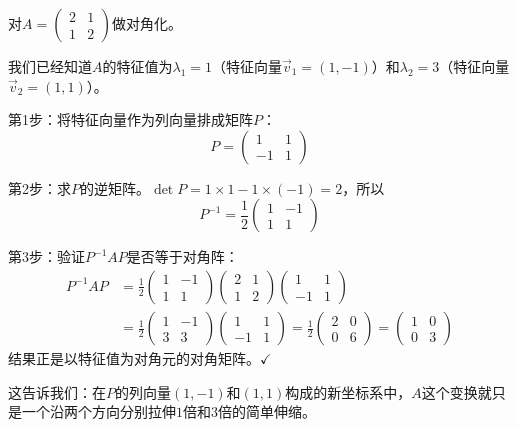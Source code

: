 \begin{example}
对$A=\begin{pmatrix}2&1\\1&2\end{pmatrix}$做对角化。
\end{example}
\begin{solution}
我们已经知道$A$的特征值为$\lambda_1=1$（特征向量$\vec v_1=(1,-1)$）和$\lambda_2=3$（特征向量$\vec v_2=(1,1)$）。

第1步：将特征向量作为列向量排成矩阵$P$：
\[
P = \begin{pmatrix}1&1\\-1&1\end{pmatrix}
\]

第2步：求$P$的逆矩阵。$\det P = 1\times1-1\times(-1)=2$，所以
\[
P^{-1} = \frac12\begin{pmatrix}1&-1\\1&1\end{pmatrix}
\]

第3步：验证$P^{-1}AP$是否等于对角阵：
\begin{align*}
P^{-1}AP &= \frac12\begin{pmatrix}1&-1\\1&1\end{pmatrix}
\begin{pmatrix}2&1\\1&2\end{pmatrix}
\begin{pmatrix}1&1\\-1&1\end{pmatrix}\\[1mm]
&= \frac12\begin{pmatrix}1&-1\\3&3\end{pmatrix}
\begin{pmatrix}1&1\\-1&1\end{pmatrix}
= \frac12\begin{pmatrix}2&0\\0&6\end{pmatrix}
= \begin{pmatrix}1&0\\0&3\end{pmatrix}
\end{align*}
结果正是以特征值为对角元的对角矩阵。$\checkmark$

这告诉我们：在$P$的列向量$(1,-1)$和$(1,1)$构成的新坐标系中，$A$这个变换就只是一个沿两个方向分别拉伸$1$倍和$3$倍的简单伸缩。
\end{solution}

